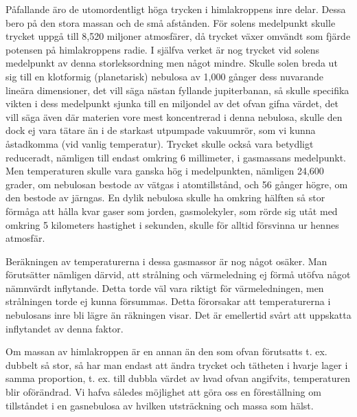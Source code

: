 \documentclass[a4paper, 12pt, oneside, swedish]{article}
\begin{document}
Påfallande äro de utomordentligt höga trycken i himlakroppens inre delar. Dessa bero på den stora massan och de små afstånden. För solens medelpunkt skulle trycket uppgå till 8,520 miljoner atmosfärer, då trycket växer omvändt som fjärde potensen på himlakroppens radie. I själfva verket är nog trycket vid solens medelpunkt av denna storleksordning men något mindre. Skulle solen breda ut sig till en klotformig (planetarisk) nebulosa av 1,000 gånger dess nuvarande lineära dimensioner, det vill säga nästan fyllande jupiterbanan, så skulle specifika vikten i dess medelpunkt sjunka till en miljondel av det ofvan gifna värdet, det vill säga även där materien vore mest koncentrerad i denna nebulosa, skulle den dock ej vara tätare än i de starkast utpumpade vakuumrör, som vi kunna åstadkomma (vid vanlig temperatur). Trycket skulle också vara betydligt reduceradt, nämligen till endast omkring 6 millimeter, i gasmassans medelpunkt. Men temperaturen skulle vara ganska hög i medelpunkten, nämligen 24,600 grader, om nebulosan bestode av vätgas i atomtillstånd, och 56 gånger högre, om den bestode av järngas. En dylik nebulosa skulle ha omkring hälften så stor förmåga att hålla kvar gaser som jorden, gasmolekyler, som rörde sig utåt med omkring 5 kilometers hastighet i sekunden, skulle för alltid försvinna ur hennes atmosfär.

Beräkningen av temperaturerna i dessa gasmassor är nog något osäker. Man förutsätter nämligen därvid, att strålning och värmeledning ej förmå utöfva något nämnvärdt inflytande. Detta torde väl vara riktigt för värmeledningen, men strålningen torde ej kunna försummas. Detta förorsakar att temperaturerna i nebulosans inre bli lägre än räkningen visar. Det är emellertid svårt att uppskatta inflytandet av denna faktor.

Om massan av himlakroppen är en annan än den som ofvan förutsatts t. ex. dubbelt så stor, så har man endast att ändra trycket och tätheten i hvarje lager i samma proportion, t. ex. till dubbla värdet av hvad ofvan angifvits, temperaturen blir oförändrad. Vi hafva således möjlighet att göra oss en föreställning om tillståndet i en gasnebulosa av hvilken utsträckning och massa som hälst.
\end{document}
